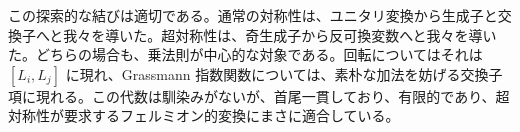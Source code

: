 \begin{classroomqa}
\end{classroomqa}

この探索的な結びは適切である。通常の対称性は、ユニタリ変換から生成子と交換子へと我々を導いた。超対称性は、奇生成子から反可換変数へと我々を導いた。どちらの場合も、乗法則が中心的な対象である。回転についてはそれは \([L_i,L_j]\) に現れ、Grassmann 指数関数については、素朴な加法を妨げる交換子項に現れる。この代数は馴染みがないが、首尾一貫しており、有限的であり、超対称性が要求するフェルミオン的変換にまさに適合している。
